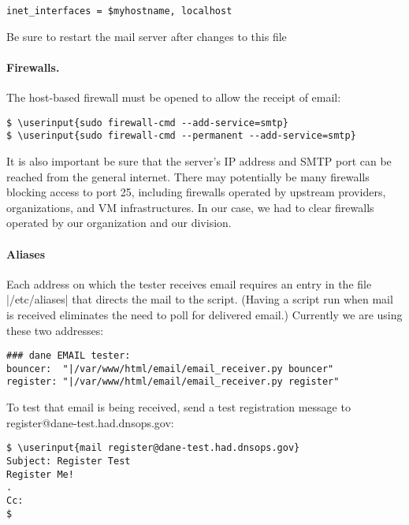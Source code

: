 \documentclass[preprint,3p,11pt]{elsarticle}
\newcommand\userinput[1]{\textbf{#1}}
\begin{document}
\begin{Verbatim}[commandchars=\\\{\},fontsize=\small]
inet_interfaces = $myhostname, localhost
\end{Verbatim}

Be sure to restart the mail server after changes to this file

\paragraph{Firewalls.} The host-based firewall must be opened to allow the receipt of email:

\begin{Verbatim}[commandchars=\\\{\},fontsize=\small]
$ \userinput{sudo firewall-cmd --add-service=smtp}
$ \userinput{sudo firewall-cmd --permanent --add-service=smtp}
\end{Verbatim}

It is also important be sure that the server's IP address and SMTP
port can be reached from the general internet. There may potentially
be many firewalls blocking access to port 25, including firewalls
operated by upstream providers, organizations, and VM
infrastructures. In our case, we had to clear firewalls operated by
our organization and our division.

\paragraph{Aliases}

Each address on which the tester receives email requires an entry in
the file |/etc/aliases| that directs the mail to the script. (Having a
script run when mail is received eliminates the need to poll for
delivered email.)  Currently we are using these two addresses:

\begin{Verbatim}[commandchars=\\\{\},fontsize=\small]
### dane EMAIL tester:
bouncer:  "|/var/www/html/email/email_receiver.py bouncer"
register: "|/var/www/html/email/email_receiver.py register"
\end{Verbatim}

To test that email is being received, send a test registration message
to register@dane-test.had.dnsops.gov:

\begin{Verbatim}[commandchars=\\\{\},fontsize=\small]
$ \userinput{mail register@dane-test.had.dnsops.gov}
Subject: Register Test
Register Me!
.
Cc:
$
\end{Verbatim}
\end{document}

